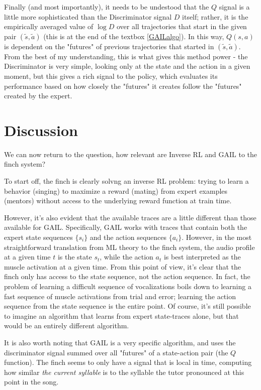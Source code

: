\documentclass[aps,prl,preprint,groupedaddress]{revtex4-1}
\begin{document}
Finally (and most importantly), it needs to be undestood that the $Q$ signal is a little more sophisticated than 
the Discriminator signal $D$ itself; 
rather, it is the empirically averaged value of $\log D$ over all trajectories that start 
in the given pair $(\tilde s, \tilde a)$ (this is at the end of the textbox \ref{GAILalgo}). 
In this way, $Q(s, a)$ is dependent on the "futures" of previous trajectories that started in $(\tilde s, \tilde a)$. 
From the best of my understanding, this is what gives this method power - the Discriminator is very simple, 
looking only at the state and the action in a given moment, but this gives a rich signal to the policy, 
which evaluates its performance based on how closely the "futures" it creates follow the "futures" created by the expert.

\section{Discussion}

We can now return to the question, how relevant are Inverse RL and GAIL to the finch system?

To start off, the finch is clearly solvng an inverse RL problem:
trying to learn a behavior (singing) to maximize a reward (mating) 
from expert examples (mentors) without access to the underlying reward function at train time.

However, it's also evident that the available traces are a little different than those available for GAIL. 
Specifically, GAIL works with traces that contain both the expert state sequences 
$\{ s_i \}$ and the action sequences $\{ a_i \}$. 
However, in the most straightforward translation from ML theory to the finch system, 
the audio profile at a given time $t$ is the state $s_t$, 
while the action $a_t$ is best interpreted as the muscle activation at a given time. 
From this point of view, it's clear that the finch only has access to the state sequence, not the action sequence. 
In fact, the problem of learning a difficult sequence of vocalizations 
boils down to learning a fast sequence of muscle activations from trial and error; 
learning the action sequence from the state sequence is the entire point. 
Of course, it's still possible to imagine an algorithm that learns from expert state-traces alone, 
but that would be an entirely different algorithm. 

It is also worth noting that GAIL is a very specific algorithm, 
and uses the discriminator signal summed over all "futures" of a state-action pair (the $Q$ function). 
The finch seems to only have a signal that is local in time, 
computing how similar \emph{the current syllable} is to the syllable the tutor pronounced at this point in the song.
\end{document}
